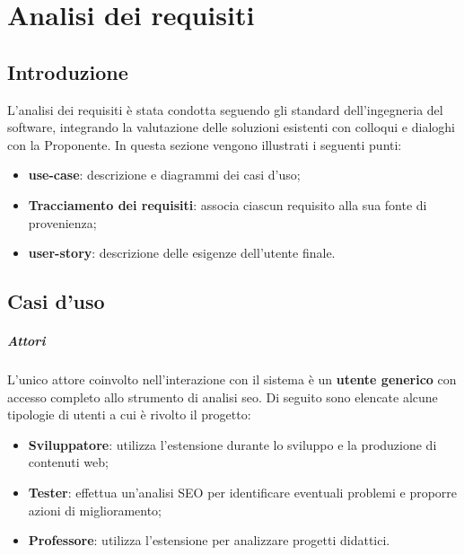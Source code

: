 \chapter{Analisi dei requisiti}
\label{cap:analisi-requisiti}


\section{Introduzione}

\par L'analisi dei \gls{requisiti} è stata condotta seguendo gli standard dell'ingegneria del software, integrando la valutazione delle soluzioni esistenti con colloqui e dialoghi con la Proponente. In questa sezione vengono illustrati i seguenti punti:
\begin{itemize}
    \item \textbf{\Gls{use-case}}: descrizione e diagrammi dei casi d'uso;
    \item \textbf{Tracciamento dei requisiti}: associa ciascun requisito alla sua fonte di provenienza;
    \item \textbf{\Gls{user-story}}: descrizione delle esigenze dell’utente finale.
\end{itemize}

\section{Casi d'uso}

\paragraph*{Attori}
\par L'unico attore coinvolto nell'interazione con il sistema è un \textbf{utente generico} con accesso completo allo strumento di analisi \gls{seo}. Di seguito sono elencate alcune tipologie di utenti a cui è rivolto il progetto:
\begin{itemize}
    \item \textbf{Sviluppatore}: utilizza l'estensione durante lo sviluppo e la produzione di contenuti web;
    \item \textbf{Tester}: effettua un'analisi SEO per identificare eventuali problemi e proporre azioni di miglioramento;
    \item \textbf{Professore}: utilizza l'estensione per analizzare progetti didattici.
\end{itemize}

